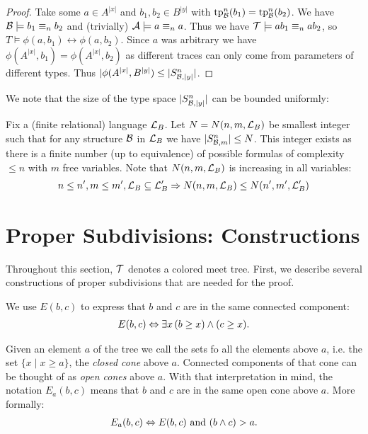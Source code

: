 \begin{proof}
  Take some $a \in A^{|x|}$ and $b_1, b_2 \in B^{|y|}$ with $\operatorname{tp}^n_{\mathcal B}(b_1) = \operatorname{tp}^n_{\mathcal B}(b_2)$. We have $\mathcal B \models b_1 \equiv_n b_2$ and (trivially) $\mathcal A \models a \equiv_n a$. Thus  we have $\operatorname{\mathcal T} \models ab_1 \equiv_n ab_2$, so $T \models \phi(a, b_1) \leftrightarrow \phi(a, b_2)$. Since $a$ was arbitrary we have $\phi(A^{|x|}, b_1) = \phi(A^{|x|}, b_2)$ as different traces can only come from parameters of different types. Thus $|\phi(A^{|x|}, B^{|y|}) \leq |S^n_{\mathcal B, |y|}|$.
\end{proof}

We note that the size of the type space $|S^n_{\mathcal B, |y|}|$ can be bounded uniformly:

\begin{Definition} \label{def_type_count}
  Fix a (finite relational) language $\mathcal L_B$. Let $N = N(n, m, \mathcal L_B)$ be smallest integer such that for any structure $\mathcal B$ in $\mathcal L_B$ we have $|S^n_{\mathcal B, m}| \leq N$. This integer exists as there is a finite number (up to equivalence) of possible formulas of complexity $\leq n$ with $m$ free variables.
  Note that $N(n, m, \mathcal L_B)$ is increasing in all variables:
  \begin{align*}
    n \leq n', m \leq m', \mathcal L_B \subseteq \mathcal L_B' \Rightarrow N(n, m, \mathcal L_B) \leq N(n', m', \mathcal L_B')
  \end{align*}
\end{Definition}

\section{Proper Subdivisions: Constructions}

Throughout this section, $\operatorname{\mathcal T}$ denotes a colored meet tree.
First, we describe several constructions of proper subdivisions that are needed for the proof. 

\begin{Definition}
  We use $E(b,c)$ to express that $b$ and $c$ are in the same connected component:
  \begin{align*}
    E(b, c) \Leftrightarrow \exists x \, (b \geq x) \wedge (c \geq x).
  \end{align*}
\end{Definition}
\begin{Definition}
  Given an element $a$ of the tree we call the sets fo all the elements above $a$, i.e. the set $\{x \mid x \geq a\}$,
  the \emph{closed cone} above $a$.
  Connected components of that cone can be thought of as \emph{open cones} above $a$.
  With that interpretation in mind, the notation $E_a(b, c)$ means that $b$ and $c$ are in the same open cone above $a$. More formally:
  \begin{align*}
    E_a(b, c) \Leftrightarrow E(b,c) \text{ and } (b \wedge c) > a.
  \end{align*}
\end{Definition}

